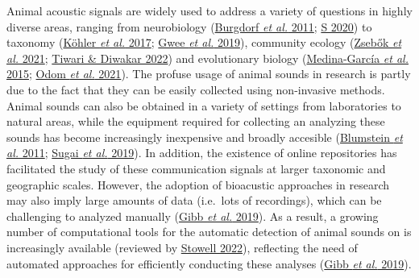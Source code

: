 \documentclass[
]{article}
\begin{document}
Animal acoustic signals are widely used to address a variety of
questions in highly diverse areas, ranging from neurobiology
(\protect\hyperlink{ref-Burgdorf2011}{Burgdorf \emph{et al.} 2011};
\protect\hyperlink{ref-schoneich2020}{S 2020}) to taxonomy
(\protect\hyperlink{ref-Kohler2017}{Köhler \emph{et al.} 2017};
\protect\hyperlink{ref-gew2019}{Gwee \emph{et al.} 2019}), community
ecology (\protect\hyperlink{ref-zsebok2021}{Zsebők \emph{et al.} 2021};
\protect\hyperlink{ref-tiwari2022}{Tiwari \& Diwakar 2022}) and
evolutionary biology
(\protect\hyperlink{ref-Medina-Garcia2015a}{Medina-García \emph{et al.}
2015}; \protect\hyperlink{ref-Odom2021}{Odom \emph{et al.} 2021}). The
profuse usage of animal sounds in research is partly due to the fact
that they can be easily collected using non-invasive methods. Animal
sounds can also be obtained in a variety of settings from laboratories
to natural areas, while the equipment required for collecting an
analyzing these sounds has become increasingly inexpensive and broadly
accesible (\protect\hyperlink{ref-Blumstein2011}{Blumstein \emph{et al.}
2011}; \protect\hyperlink{ref-sugai2019}{Sugai \emph{et al.} 2019}). In
addition, the existence of online repositories has facilitated the study
of these communication signals at larger taxonomic and geographic
scales. However, the adoption of bioacustic approaches in research may
also imply large amounts of data (i.e.~lots of recordings), which can be
challenging to analyzed manually (\protect\hyperlink{ref-gibb2019}{Gibb
\emph{et al.} 2019}). As a result, a growing number of computational
tools for the automatic detection of animal sounds on is increasingly
available (reviewed by \protect\hyperlink{ref-Stowell2022}{Stowell
2022}), reflecting the need of automated approaches for efficiently
conducting these analyses (\protect\hyperlink{ref-gibb2019}{Gibb
\emph{et al.} 2019}).
\end{document}
